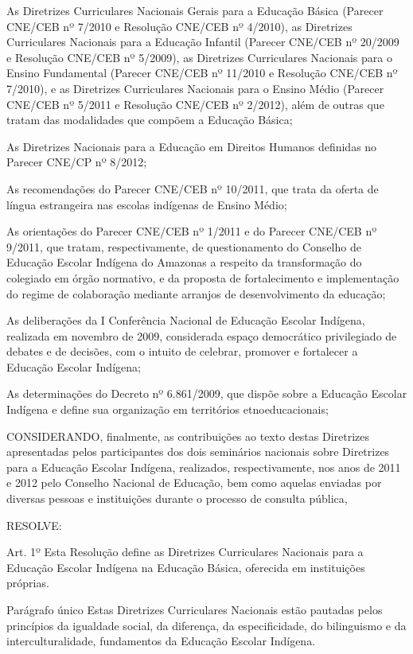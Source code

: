 \documentclass[
]{book}
\begin{document}
As Diretrizes Curriculares Nacionais Gerais para a Educação Básica (Parecer CNE/CEB nº 7/2010 e Resolução CNE/CEB nº 4/2010), as Diretrizes Curriculares Nacionais para a Educação Infantil (Parecer CNE/CEB nº 20/2009 e Resolução CNE/CEB nº 5/2009), as Diretrizes Curriculares Nacionais para o Ensino Fundamental (Parecer CNE/CEB nº 11/2010 e Resolução CNE/CEB nº 7/2010), e as Diretrizes Curriculares Nacionais para o Ensino Médio (Parecer CNE/CEB nº 5/2011 e Resolução CNE/CEB nº 2/2012), além de outras que tratam das modalidades que compõem a Educação Básica;

As Diretrizes Nacionais para a Educação em Direitos Humanos definidas no Parecer CNE/CP nº 8/2012;

As recomendações do Parecer CNE/CEB nº 10/2011, que trata da oferta de língua estrangeira nas escolas indígenas de Ensino Médio;

As orientações do Parecer CNE/CEB nº 1/2011 e do Parecer CNE/CEB nº 9/2011, que tratam, respectivamente, de questionamento do Conselho de Educação Escolar Indígena do Amazonas a respeito da transformação do colegiado em órgão normativo, e da proposta de fortalecimento e implementação do regime de colaboração mediante arranjos de desenvolvimento da educação;

As deliberações da I Conferência Nacional de Educação Escolar Indígena, realizada em novembro de 2009, considerada espaço democrático privilegiado de debates e de decisões, com o intuito de celebrar, promover e fortalecer a Educação Escolar Indígena;

As determinações do Decreto nº 6.861/2009, que dispõe sobre a Educação Escolar Indígena e define sua organização em territórios etnoeducacionais;

CONSIDERANDO, finalmente, as contribuições ao texto destas Diretrizes apresentadas pelos participantes dos dois seminários nacionais sobre Diretrizes para a Educação Escolar Indígena, realizados, respectivamente, nos anos de 2011 e 2012 pelo Conselho Nacional de Educação, bem como aquelas enviadas por diversas pessoas e instituições durante o processo de consulta pública,

RESOLVE:

Art. 1º Esta Resolução define as Diretrizes Curriculares Nacionais para a Educação Escolar Indígena na Educação Básica, oferecida em instituições próprias.

Parágrafo único Estas Diretrizes Curriculares Nacionais estão pautadas pelos princípios da igualdade social, da diferença, da especificidade, do bilinguismo e da interculturalidade, fundamentos da Educação Escolar Indígena.
\end{document}
